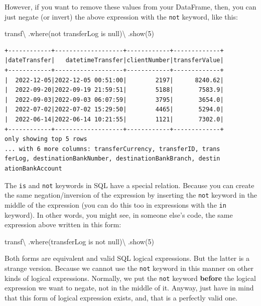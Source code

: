 \documentclass[
  11pt,
  letterpaper,
  DIV=11,
  numbers=noendperiod]{scrreprt}
\newenvironment{Shaded}{\begin{snugshade}}{\end{snugshade}}
\newcommand{\DecValTok}[1]{\textcolor[rgb]{0.68,0.00,0.00}{#1}}
\newcommand{\NormalTok}[1]{\textcolor[rgb]{0.00,0.23,0.31}{#1}}
\newcommand{\OperatorTok}[1]{\textcolor[rgb]{0.37,0.37,0.37}{#1}}
\newcommand{\StringTok}[1]{\textcolor[rgb]{0.13,0.47,0.30}{#1}}
\begin{document}
However, if you want to remove these values from your DataFrame, then,
you can just negate (or invert) the above expression with the
\texttt{not} keyword, like this:

\begin{Shaded}
\begin{Highlighting}[]
\NormalTok{transf}\OperatorTok{\textbackslash{}}
\NormalTok{  .where(}\StringTok{\textquotesingle{}not transferLog is null\textquotesingle{}}\NormalTok{)}\OperatorTok{\textbackslash{}}
\NormalTok{  .show(}\DecValTok{5}\NormalTok{)}
\end{Highlighting}
\end{Shaded}

\begin{verbatim}
+------------+-------------------+------------+-------------+
|dateTransfer|   datetimeTransfer|clientNumber|transferValue|
+------------+-------------------+------------+-------------+
|  2022-12-05|2022-12-05 00:51:00|        2197|      8240.62|
|  2022-09-20|2022-09-19 21:59:51|        5188|       7583.9|
|  2022-09-03|2022-09-03 06:07:59|        3795|       3654.0|
|  2022-07-02|2022-07-02 15:29:50|        4465|       5294.0|
|  2022-06-14|2022-06-14 10:21:55|        1121|       7302.0|
+------------+-------------------+------------+-------------+
only showing top 5 rows
... with 6 more columns: transferCurrency, transferID, trans
ferLog, destinationBankNumber, destinationBankBranch, destin
ationBankAccount
\end{verbatim}

The \texttt{is} and \texttt{not} keywords in SQL have a special
relation. Because you can create the same negation/inversion of the
expression by inserting the \texttt{not} keyword in the middle of the
expression (you can do this too in expressions with the \texttt{in}
keyword). In other words, you might see, in someone else's code, the
same expression above written in this form:

\begin{Shaded}
\begin{Highlighting}[]
\NormalTok{transf}\OperatorTok{\textbackslash{}}
\NormalTok{  .where(}\StringTok{\textquotesingle{}transferLog is not null\textquotesingle{}}\NormalTok{)}\OperatorTok{\textbackslash{}}
\NormalTok{  .show(}\DecValTok{5}\NormalTok{)}
\end{Highlighting}
\end{Shaded}

Both forms are equivalent and valid SQL logical expressions. But the
latter is a strange version. Because we cannot use the \texttt{not}
keyword in this manner on other kinds of logical expressions. Normally,
we put the \texttt{not} keyword \textbf{before} the logical expression
we want to negate, not in the middle of it. Anyway, just have in mind
that this form of logical expression exists, and, that is a perfectly
valid one.
\end{document}
